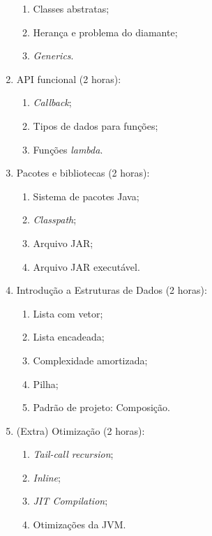 \documentclass{article}
\begin{document}
\begin{enumerate}
\begin{samepage}
\begin{enumerate}
                \item Classes abstratas;
                \item Herança e problema do diamante;
                \item \textit{Generics}.
        \end{enumerate}
        \end{samepage}
    \item API funcional (2 horas):
        \begin{samepage}
        \begin{enumerate}
                \item \textit{Callback};
                \item Tipos de dados para funções;
                \item Funções \textit{lambda}.
        \end{enumerate}
        \end{samepage}
    \item Pacotes e bibliotecas (2 horas):
        \begin{samepage}
        \begin{enumerate}
                \item Sistema de pacotes Java;
                \item \textit{Classpath};
                \item Arquivo JAR\@;
                \item Arquivo JAR executável.
        \end{enumerate}
        \end{samepage}
    \item Introdução a Estruturas de Dados (2 horas):
        \begin{samepage}
        \begin{enumerate}
                \item Lista com vetor;
                \item Lista encadeada;
                \item Complexidade amortizada;
                \item Pilha;
                \item Padrão de projeto: Composição.
        \end{enumerate}
        \end{samepage}
    \item (Extra) Otimização (2 horas):
        \begin{samepage}
        \begin{enumerate}
                \item \textit{Tail-call recursion};
                \item \textit{Inline};
                \item \textit{JIT Compilation};
                \item Otimizações da JVM\@.
        \end{enumerate}
        \end{samepage}
\end{enumerate}
\end{document}
